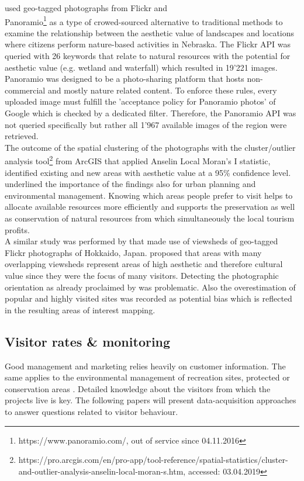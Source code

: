 \textcite{Figueroa-Alfaro2017} used geo-tagged photographs from Flickr and \\ Panoramio\footnote{https://www.panoramio.com/, out of service since 04.11.2016} as a type of crowed-sourced alternative to traditional methods to examine the relationship between the aesthetic value of landscapes and locations where citizens perform nature-based activities in Nebraska. The Flickr API was queried with 26 keywords that relate to natural resources with the potential for aesthetic value (e.g. wetland and waterfall) which resulted in 19'221 images. Panoramio was designed to be a photo-sharing platform that hosts non-commercial and mostly nature related content. To enforce these rules, every uploaded image must fulfill the 'acceptance policy for Panoramio photos' of Google which is checked by a dedicated filter. Therefore, the Panoramio API was not queried specifically but rather all 1'967 available images of the region were retrieved.\\
The outcome of the spatial clustering of the photographs with the cluster/outlier analysis tool\footnote{https://pro.arcgis.com/en/pro-app/tool-reference/spatial-statistics/cluster-and-outlier-analysis-anselin-local-moran-s.htm, accessed: 03.04.2019} from ArcGIS that applied Anselin Local Moran's I statistic, identified existing and new areas with aesthetic value at a 95\% confidence level. \citeauthor{Figueroa-Alfaro2017} underlined the importance of the findings also for urban planning and environmental management. Knowing which areas people prefer to visit helps to allocate available resources more efficiently and supports the preservation as well as conservation of natural resources from which simultaneously the local tourism profits. \\
\newline
A similar study was performed by \textcite{Yoshimura2017} that made use of viewsheds of geo-tagged Flickr photographs of Hokkaido, Japan. \citeauthor{Yoshimura2017} proposed that areas with many overlapping viewsheds represent areas of high aesthetic and therefore cultural value since they were the focus of many visitors. Detecting the photographic orientation as already proclaimed by \textcite{Unknown2013} was problematic. Also the overestimation of popular and highly visited sites was recorded as potential bias which is reflected in the resulting areas of interest mapping.


\subsection{Visitor rates \& monitoring}
Good management and marketing relies heavily on customer information. The same applies to the environmental management of recreation sites, protected or conservation areas \parencite{Ralf1991}. Detailed knowledge about the visitors from which the projects live is key. The following papers will present data-acquisition approaches to answer questions related to visitor behaviour. \\  

